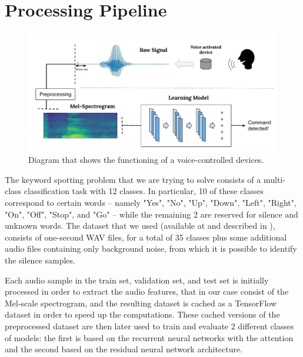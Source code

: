 

\section{Processing Pipeline}
\label{sec:processing_architecture}

\begin{figure}[htbp]
\centerline{\includegraphics[scale=.35]{processing_pipeline.pdf}}
\caption{Diagram that shows the functioning of a voice-controlled devices.}
\label{fig}
\end{figure}
 

The keyword spotting problem that we are trying to solve consists of a multi-class classification task with 12 classes. In particular, 10 of these classes correspond to certain words -- namely "Yes", "No", "Up", "Down", "Left", "Right", "On", "Off", "Stop", and "Go" -- while the remaining 2 are reserved for silence and unknown words.
The dataset that we used (available at \cite{5} and described in \cite{4}), consists of one-second WAV files, for a total of 35 classes plus some additional audio files containing only background noise, from which it is possible to identify the silence samples.


Each audio sample in the train set, validation set, and test set is initially processed in order to extract the audio features, that in our case consist of the Mel-scale spectrogram, and the resulting dataset is cached as a TensorFlow dataset in order to speed up the computations.
These cached versions of the preprocessed dataset are then later used to train and evaluate 2 different classes of models: the first is based on the recurrent neural networks with the attention and the second based on the residual neural network architecture.


